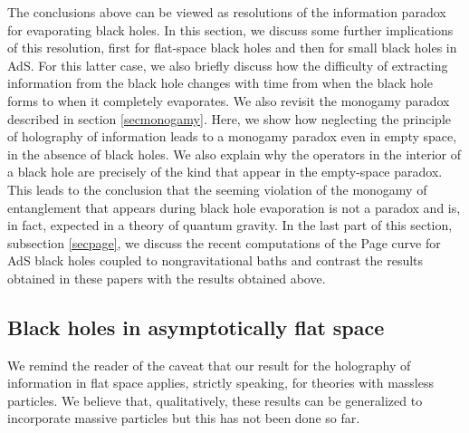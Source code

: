 \documentclass[12pt]{article}
\begin{document}
The conclusions above can be viewed as resolutions of the information paradox for evaporating black holes. 
In this section, we discuss some further implications of this resolution, first for flat-space black holes and then for small black holes in AdS. For this latter case, we also briefly discuss how the difficulty of extracting information from the black hole changes with time from when the black hole forms to when it completely evaporates. We also revisit the monogamy paradox described in section \ref{secmonogamy}. 
Here, we show how neglecting the principle of holography of information leads to a monogamy paradox even in empty space, in the absence of black holes.  We also explain why the operators in the interior of a black hole are precisely of the kind that appear in the empty-space paradox.  This leads to the conclusion that the seeming violation of the monogamy of entanglement that appears during black hole evaporation is not a paradox and is, in fact, expected in a theory of quantum gravity. In the last part of this section, subsection \ref{secpage}, we discuss the recent computations of the Page curve for AdS black holes coupled to nongravitational baths and contrast the results obtained in these papers with the results obtained above.








\subsection{Black holes in asymptotically flat space}
We remind the reader of the caveat that our result for the holography of information in flat space applies, strictly speaking, for theories with massless particles. We believe that, qualitatively, these results can be generalized to incorporate massive particles but this has not been done so far.
\end{document}
